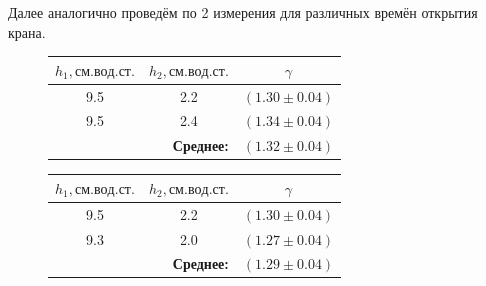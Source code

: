 \documentclass[a4paper, 12pt]{article}
\begin{document}
			Далее аналогично проведём по 2 измерения для различных времён открытия крана.

			\begin{figure}[ht!]
				\begin{minipage}[c]{.49\linewidth}
					\centering
					\begin{tabular}{|c|c|c|}
						\hline

						$h_1, см.вод.ст.$ & $h_2, см.вод.ст.$ & $\gamma$\\ \hline
						9.5 & 2.2 & $(1.30 \pm 0.04)$\\ \hline
						9.5 & 2.4 & $(1.34 \pm 0.04)$\\ \hline
						\multicolumn{2}{|r|}{\textbf{Среднее:}} & $\boldsymbol{(1.32 \pm 0.04)}$ \\ \hline

					\end{tabular}
					\label{table:gamma_2}

				\end{minipage} \hfill
				\begin{minipage}[c]{.49\linewidth}
					\centering
					\begin{tabular}{|c|c|c|}
						\hline

						$h_1, см.вод.ст.$ & $h_2, см.вод.ст.$ & $\gamma$\\ \hline
						9.5 & 2.2 & $(1.30 \pm 0.04)$\\ \hline
						9.3 & 2.0 & $(1.27 \pm 0.04)$\\ \hline
						\multicolumn{2}{|r|}{\textbf{Среднее:}} & $\boldsymbol{(1.29 \pm 0.04)}$ \\ \hline

					\end{tabular}
					\label{table:gamma_3}
				\end{minipage}
			\end{figure}
\end{document}
